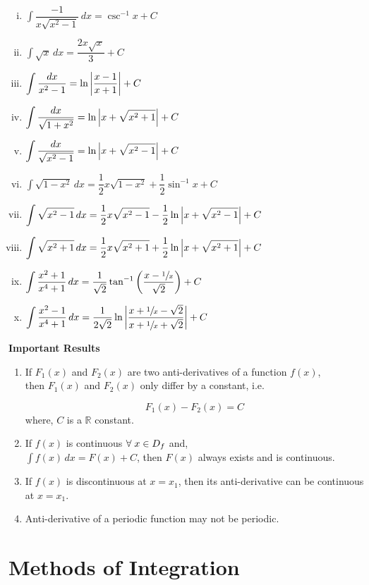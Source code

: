 \documentclass{article}
\begin{document}
\begin{enumerate}[i.]
    \item $\displaystyle\int \dfrac{-1}{x\displaystyle\sqrt{x^2-1}} \, dx=\csc^{-1}x+C$
    \item $\displaystyle\int \sqrt{x} \, dx=\dfrac{2x\sqrt{x}}{3}+C$
    \item $\displaystyle\int \dfrac{dx}{x^2-1}=\ln \abs{\dfrac{x-1}{x+1}}+C $
    \item $\displaystyle\int \dfrac{dx}{\sqrt{1+x^2}}=\ln \abs{x+\sqrt{x^2+1}}+C$
    \item $\displaystyle\int \dfrac{dx}{\sqrt{x^2-1}}=\ln \abs{x+\sqrt{x^2-1}}+C$
    \item $\displaystyle\int \sqrt{1-x^2} \, dx=\dfrac{1}{2}x\sqrt{1-x^2}+\dfrac{1}{2} \sin^{-1} x +C $
    \item $\displaystyle\int \sqrt{x^2-1} \, dx= \dfrac{1}{2}x\sqrt{x^2-1}-\dfrac{1}{2}\ln \abs{x+\sqrt{x^2-1}}+C $
    \item $\displaystyle\int \sqrt{x^2+1} \, dx=\dfrac{1}{2}x\sqrt{x^2+1}+\dfrac{1}{2}\ln \abs{x+\sqrt{x^2+1}}+C$
    \item $\displaystyle\int \dfrac{x^2+1}{x^4+1} \, dx=\dfrac{1}{\sqrt{2}}\tan^{-1}\left(\dfrac{x-\sfrac{1}{x}}{\sqrt{2}}\right)+C$
    \item $\displaystyle\int \dfrac{x^2-1}{x^4+1} \, dx=\dfrac{1}{2\sqrt{2}}\ln \abs{\dfrac{x+\sfrac{1}{x}- \sqrt{2}}{x+\sfrac{1}{x}+\sqrt{2}}}+C$

\end{enumerate}
\textbf{Important Results}
\begin{enumerate}
    \item If $F_{1}(x)$ and $F_{2}(x)$ are two anti-derivatives of a function $f(x)$, \\then $F_{1}(x) $ and $F_{2}(x) $ only differ by a constant, i.e.

          $$F_{1}(x) - F_{2}(x)=C$$
          where, $C$ is a $\mathbb{R}$ constant.
    \item If $f(x)$ is continuous $\forall \hspace{1mm} x \in D_{f}$ and,\\
          $\displaystyle\int f(x) \, dx=F(x)+C$, then $F(x)$ always exists and is continuous.
    \item If $f(x)$ is discontinuous at $x=x_{1}$, then its anti-derivative can be continuous at $x=x_{1}$.
    \item Anti-derivative of a periodic function may not be periodic.
\end{enumerate}

\section{Methods of Integration}
\end{document}
